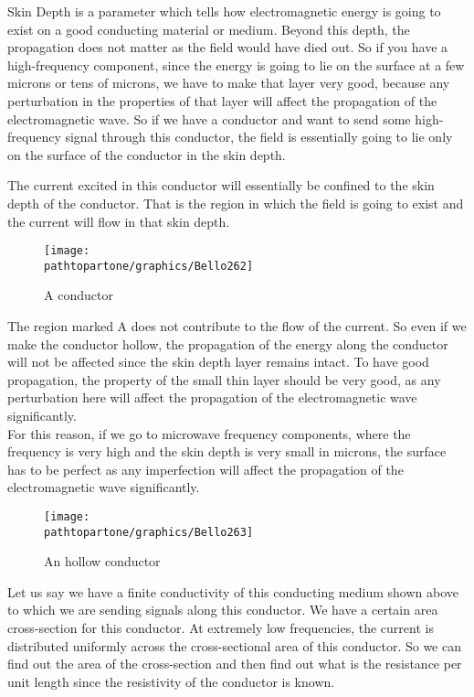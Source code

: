 Skin Depth is a parameter which tells how electromagnetic energy is going to exist on a good conducting material or medium. Beyond this depth, the propagation does not matter as the field would have died out. So if you have a high-frequency component, since the energy is going to lie on the surface at a few microns or tens of microns, we have to make that layer very good, because any perturbation in the properties of that layer will affect the propagation of the electromagnetic wave. So if we have a conductor and want to send some high-frequency signal through this conductor, the field is essentially going to lie only on the surface of the conductor in the skin depth.

The current excited in this conductor will essentially be confined to the skin depth of the conductor. That is the region in which the field is going to exist and the current will flow in that skin depth.
\begin{figure}[h]
\centering
\texttt{[image: \\pathtopartone/graphics/Bello262]}
\caption{A conductor}
\end{figure}

The region marked A does not contribute to the flow of the current. So even if we make the conductor hollow, the propagation of the energy along the conductor will not be affected since the skin depth layer remains intact. To have good propagation, the property of the small thin layer should be very good, as any perturbation here will affect the propagation of the electromagnetic wave significantly.\\		
For this reason, if we go to microwave frequency components, where the frequency is very high and the skin depth is very small in microns, the surface has to be perfect as any imperfection will affect the propagation of the electromagnetic wave significantly.
\begin{figure}[h]
\centering
\texttt{[image: \\pathtopartone/graphics/Bello263]}
\caption{An hollow conductor}
\end{figure}

Let us say we have a finite conductivity of this conducting medium shown above to which we are sending signals along this conductor. We have a certain area cross-section for this conductor. At extremely low frequencies, the current is distributed uniformly across the cross-sectional area of this conductor. So we can find out the area of the cross-section and then find out what is the resistance per unit length since the resistivity of the conductor is known.

